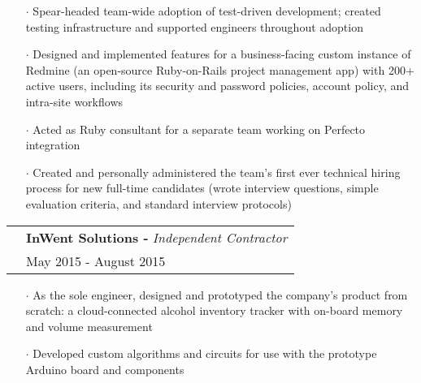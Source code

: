 \documentclass[a4paper, oneside, final]{scrartcl} %
\newcommand{\gray}{\rowcolor[gray]{.90}} %
\begin{document}
\begin{center}
\begin{itemize}
\item[$\cdot$] Spear-headed team-wide adoption of test-driven development; created testing infrastructure and supported engineers throughout adoption \\
\item[$\cdot$] Designed and implemented features for a business-facing custom instance of Redmine (an open-source Ruby-on-Rails project management app) with 200+ active users, including its security and password policies, account policy, and intra-site workflows \\
\item[$\cdot$] Acted as Ruby consultant for a separate team working on Perfecto integration \\
\item[$\cdot$] Created and personally administered the team’s first ever technical hiring process for new full-time candidates (wrote interview questions, simple evaluation criteria, and standard interview protocols)\\

\end{itemize}

\vspace{-0.05cm}

\begin{tabularx}{1.00\linewidth}{>{\raggedleft\scshape}p{0cm}X}
\gray & \textbf{InWent Solutions -} \textit{Independent Contractor}\\
\gray & {May 2015 - August 2015}\\
\end{tabularx}
\vspace{-0.2cm}
\begin{itemize}\itemsep-0.2cm
\vspace{-0.1cm}

\item[$\cdot$] As the sole engineer, designed and prototyped the company’s product from scratch: a cloud-connected alcohol inventory tracker with on-board memory and volume measurement  \\
\item[$\cdot$] Developed custom algorithms and circuits for use with the prototype Arduino board and components\\


\end{itemize}
\end{center}
\end{document}
